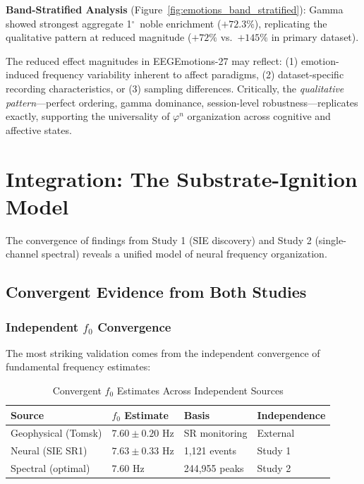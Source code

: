 \documentclass[11pt,a4paper]{article}
\newcommand{\degree}{$^\circ$}  %
\newcommand{\phisym}{\varphi}
\begin{document}
\textbf{Band-Stratified Analysis} (Figure~\ref{fig:emotions_band_stratified}): Gamma showed strongest aggregate 1\degree\ noble enrichment ($+72.3\%$), replicating the qualitative pattern at reduced magnitude ($+72\%$ vs.\ $+145\%$ in primary dataset).

The reduced effect magnitudes in EEGEmotions-27 may reflect: (1) emotion-induced frequency variability inherent to affect paradigms, (2) dataset-specific recording characteristics, or (3) sampling differences. Critically, the \textit{qualitative pattern}---perfect ordering, gamma dominance, session-level robustness---replicates exactly, supporting the universality of $\phisym^n$ organization across cognitive and affective states.

\section{Integration: The Substrate-Ignition Model}

The convergence of findings from Study 1 (SIE discovery) and Study 2 (single-channel spectral) reveals a unified model of neural frequency organization.

\subsection{Convergent Evidence from Both Studies}

\subsubsection{Independent $f_0$ Convergence}
The most striking validation comes from the independent convergence of fundamental frequency estimates:

\begin{table}[H]
\centering
\caption{Convergent $f_0$ Estimates Across Independent Sources}
\label{tab:f0_convergence}
\begin{tabular}{@{}llll@{}}
\toprule
Source & $f_0$ Estimate & Basis & Independence \\
\midrule
Geophysical (Tomsk) & $7.60 \pm 0.20$ Hz & SR monitoring & External \\
Neural (SIE SR1) & $7.63 \pm 0.33$ Hz & 1,121 events & Study 1 \\
Spectral (optimal) & $7.60$ Hz & 244,955 peaks & Study 2 \\
\bottomrule
\end{tabular}
\end{table}
\end{document}
